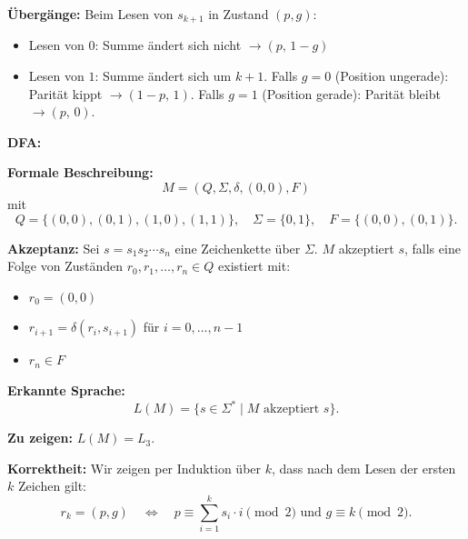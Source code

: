 \documentclass[a4paper,12pt]{article}
\begin{document}
\textbf{Übergänge:} Beim Lesen von $s_{k+1}$ in Zustand $(p,g)$:
\begin{itemize}
    \item Lesen von $0$: Summe ändert sich nicht $\to (p,\, 1-g)$
    \item Lesen von $1$: Summe ändert sich um $k+1$. Falls $g=0$ (Position ungerade): Parität kippt $\to (1-p,\, 1)$. Falls $g=1$ (Position gerade): Parität bleibt $\to (p,\, 0)$.
\end{itemize}

\textbf{DFA:}

\begin{flushleft}
\end{flushleft}

\textbf{Formale Beschreibung:}
\[
M = (Q,\Sigma,\delta,(0,0),F)
\]
mit
\[
Q=\{(0,0),(0,1),(1,0),(1,1)\}, \quad \Sigma=\{0,1\}, \quad F=\{(0,0),(0,1)\}.
\]

\textbf{Akzeptanz:}
Sei $s = s_1s_2\cdots s_n$ eine Zeichenkette über $\Sigma$.
$M$ akzeptiert $s$, falls eine Folge von Zuständen $r_0,r_1,\ldots,r_n \in Q$ existiert mit:
\begin{itemize}
    \item $r_0 = (0,0)$
    \item $r_{i+1} = \delta(r_i,s_{i+1})$ für $i = 0,\ldots,n-1$
    \item $r_n \in F$
\end{itemize}

\textbf{Erkannte Sprache:}
\[
L(M)=\{s \in \Sigma^* \mid M \text{ akzeptiert } s\}.
\]

\textbf{Zu zeigen:} $L(M)=L_3$.

\medskip
\textbf{Korrektheit:}
Wir zeigen per Induktion über $k$, dass nach dem Lesen der ersten $k$ Zeichen gilt:
\[
r_k=(p,g) \quad \Longleftrightarrow \quad
p \equiv \sum_{i=1}^{k} s_i \cdot i \pmod 2
\text{ und } g \equiv k \pmod 2.
\]
\end{document}
